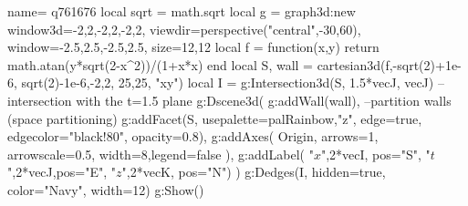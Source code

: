 \documentclass[border=5pt]{standalone}%
\begin{document}
\begin{luadraw}{name= q761676}
local sqrt = math.sqrt
local g = graph3d:new{ window3d={-2,2,-2,2,-2,2}, viewdir=perspective("central",-30,60),
    window={-2.5,2.5,-2.5,2.5}, size={12,12}}
local f = function(x,y) return math.atan(y*sqrt(2-x^2))/(1+x*x) end
local S, wall = cartesian3d(f,-sqrt(2)+1e-6, sqrt(2)-1e-6,-2,2, {25,25}, "xy")
local I = g:Intersection3d(S, {1.5*vecJ, vecJ}) -- intersection with the t=1.5 plane
g:Dscene3d(
    g:addWall(wall), --partition walls (space partitioning)
    g:addFacet(S, {usepalette={palRainbow,"z"}, edge=true, edgecolor="black!80", opacity=0.8}),
    g:addAxes( Origin, {arrows=1, arrowscale=0.5, width=8,legend=false }),
    g:addLabel( "$x$",2*vecI, {pos="S"}, "$t$",2*vecJ,{pos="E"}, "$z$",2*vecK, {pos="N"})
    )
g:Dedges(I, {hidden=true, color="Navy", width=12})
g:Show() 
\end{luadraw}
\end{document}
